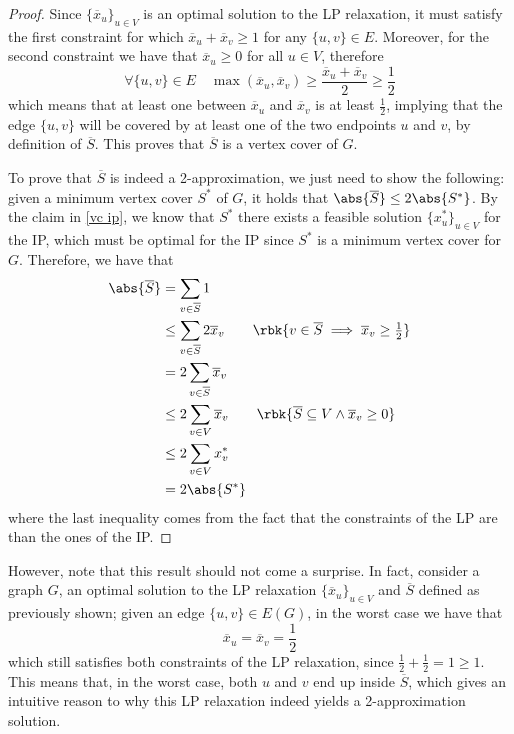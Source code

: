 \documentclass[a4paper, 12pt]{report}
\begin{document}
    \begin{proof}
        Since $\{\overline x_u\}_{u \in V}$ is an optimal solution to the LP relaxation, it must satisfy the first constraint for which $\overline x_u + \overline x_v \ge 1$ for any $\{u, v\} \in E$. Moreover, for the second constraint we have that $\overline x_u \ge 0$ for all $u \in V$, therefore $$\forall \{u, v\} \in E \quad \max(\overline x_u, \overline x_v) \ge \dfrac{\overline x_u + \overline x_v}{2} \ge \dfrac{1}{2}$$ which means that at least one between $\overline x_u$ and $\overline x_v$ is at least $\frac{1}{2}$, implying that the edge $\{u, v\}$ will be covered by at least one of the two endpoints $u$ and $v$, by definition of $\overline S$. This proves that $\overline S$ is a vertex cover of $G$.

        To prove that $\overline S$ is indeed a 2-approximation, we just need to show the following: given a minimum vertex cover $S^*$ of $G$, it holds that $\abs{\overline S} \le 2 \abs{S^*}$. By the claim in \cref{vc ip}, we know that $S^*$ there exists a feasible solution $\{x^*_u\}_{u \in V}$ for the IP, which must be optimal for the IP since $S^*$ is a minimum vertex cover for $G$. Therefore, we have that
            \begin{equation*}
                \begin{split}
                    \abs{\overline S} &= \sum_{v \in \overline S}{1} \\
                                      &\le \sum_{v \in \overline S}{2 \overline x_v} \quad \quad \rbk{v \in \overline S \implies \overline x_v \ge \tfrac{1}{2}}\\
                                      &= 2 \sum_{v \in \overline S}{\overline x_v} \\
                                      &\le 2 \sum_{v \in V}{\overline x_v} \quad \quad \rbk{\overline S \subseteq V \land \overline x_v \ge 0} \\
                                      &\le 2 \sum_{v \in V}{x^*_v} \\
                                      &= 2 \abs{S^*}
                \end{split}
            \end{equation*}
            where the last inequality comes from the fact that the constraints of the LP are  than the ones of the IP.
    \end{proof}

    However, note that this result should not come a surprise. In fact, consider a graph $G$, an optimal solution to the LP relaxation $\{\overline x_u\}_{u \in V}$ and $\overline S$ defined as previously shown; given an edge $\{u, v\} \in E(G)$, in the worst case we have that $$\overline x_u = \overline x_v = \dfrac{1}{2}$$ which still satisfies both constraints of the LP relaxation, since $\tfrac{1}{2} + \tfrac{1}{2} = 1 \ge 1$. This means that, in the worst case, both $u$ and $v$ end up inside $\overline S$, which gives an intuitive reason to why this LP relaxation indeed yields a 2-approximation solution.
\end{document}
